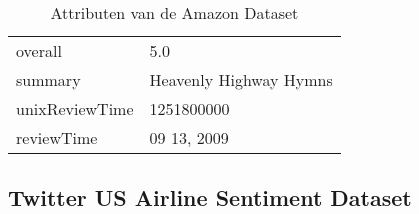 \begin{table}[]
\begin{tabular}{@{}|l|l|@{}}
        overall            & 5.0                                                                                                                                                                                                                                                                                                     \\
        summary            & Heavenly Highway Hymns                                                                                                                                                                                                                                                                                  \\
        unixReviewTime     & 1251800000                                                                                                                                                                                                                                                                                              \\
        reviewTime         & 09 13, 2009                                                                                                                                                                                                                                                                                             \\ \bottomrule
    \end{tabular}
    \caption{Attributen van de Amazon Dataset}
    \label{tab:amazondataset}
\end{table}

\subsection{Twitter US Airline Sentiment Dataset}
\label{twitter}

